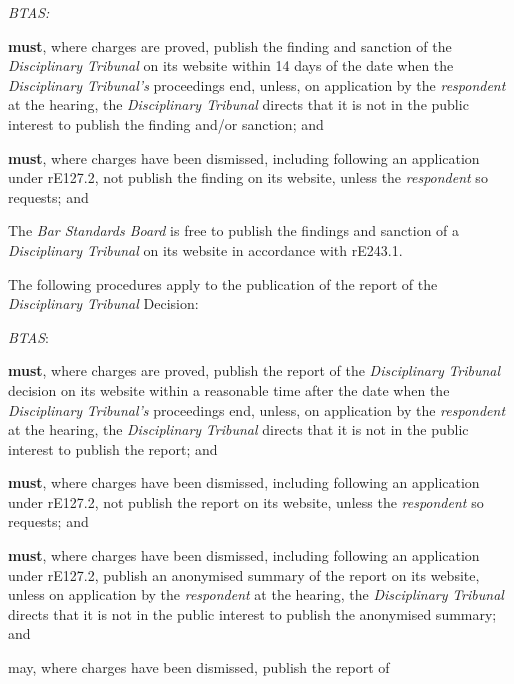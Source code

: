 \nl \item \emph{BTAS:}\al
\item  \textcolor{myred}{\textbf{must}}, where charges are proved, publish the finding and sanction of
the \emph{Disciplinary Tribunal }on its website within 14 days of the
date when the \emph{Disciplinary Tribunal's }proceedings end, unless, on
application by the \emph{respondent} at the hearing,
the \emph{Disciplinary Tribunal} directs that it is not in the public
interest to publish the finding and/or sanction; and\\
\item  \textcolor{myred}{\textbf{must}}, where charges have been dismissed, including following an
application under rE127.2, not publish the finding on its website,
unless the \emph{respondent} so requests; and\la
\item The \emph{Bar Standards Board} is free to publish the findings and
sanction of a \emph{Disciplinary Tribunal} on its website in accordance
with rE243.1.\ln
{}\par
The following procedures apply to the publication of the report of
the \emph{Disciplinary Tribunal} Decision:\\\nl \item \emph{BTAS}:\\\al
\item  \textcolor{myred}{\textbf{must}}, where charges are proved, publish the report of
the \emph{Disciplinary} \emph{Tribunal} decision on its website within a
reasonable time after the date when
the \emph{Disciplinary} \emph{Tribunal's} proceedings end, unless, on
application by the \emph{respondent} at the hearing,
the \emph{Disciplinary} \emph{Tribunal} directs that it is not in the
public interest to publish the report; and\\
\item  \textcolor{myred}{\textbf{must}}, where charges have been dismissed, including following an
application under rE127.2, not publish the report on its website, unless
the \emph{respondent} so requests; and\la
\item  \textcolor{myred}{\textbf{must}}, where charges have been dismissed, including following an
application under rE127.2, publish an anonymised summary of the report
on its website, unless on application by the \emph{respondent} at the
hearing, the \emph{Disciplinary} \emph{Tribunal} directs that it is not
in the public interest to publish the anonymised summary; and\\
\item may, where charges have been dismissed, publish the report of
